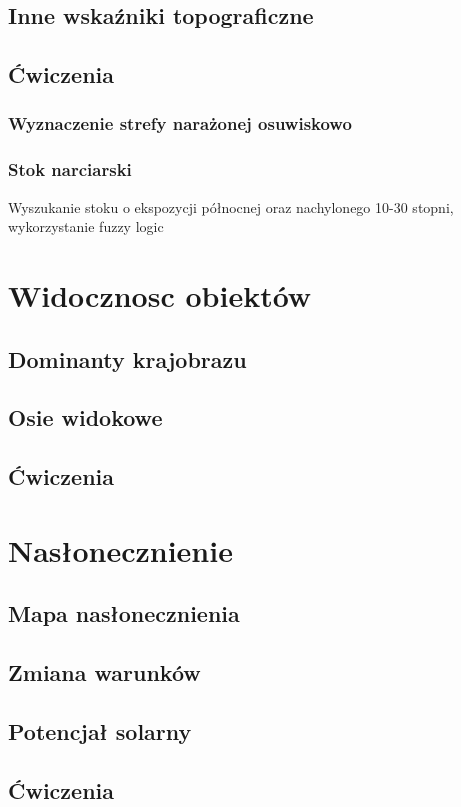 \documentclass[a4paper,11pt, onecolumn, openany]{memoir}
\begin{document}
		\section{Inne wskaźniki topograficzne}
		\section{Ćwiczenia}
			\subsection{Wyznaczenie strefy narażonej osuwiskowo}
			\subsection{Stok narciarski}
	Wyszukanie stoku o ekspozycji północnej oraz nachylonego 10-30 stopni, wykorzystanie fuzzy logic
	\chapter{Widocznosc obiektów}
\section{Dominanty krajobrazu}
\section{Osie widokowe}
\section{Ćwiczenia}

\chapter{Nasłonecznienie}
\section{Mapa nasłonecznienia}
\section{Zmiana warunków}
\section{Potencjał solarny}
\section{Ćwiczenia}
\end{document}
